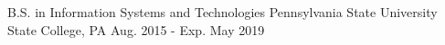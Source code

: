 

\begin{cventries}

  \cventry
    {B.S. in Information Systems and Technologies} %
    {Pennsylvania State University} %
    {State College, PA} %
    {Aug. 2015 - Exp. May 2019} %
    {
    }

\end{cventries}

